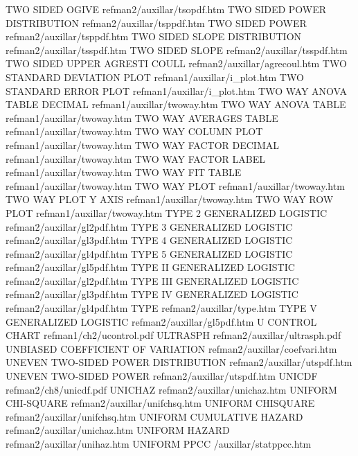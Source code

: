 TWO SIDED OGIVE                         refman2/auxillar/tsopdf.htm
TWO SIDED POWER DISTRIBUTION            refman2/auxillar/tsppdf.htm
TWO SIDED POWER                         refman2/auxillar/tsppdf.htm
TWO SIDED SLOPE DISTRIBUTION            refman2/auxillar/tsspdf.htm
TWO SIDED SLOPE                         refman2/auxillar/tsspdf.htm
TWO SIDED UPPER AGRESTI COULL           refman2/auxillar/agrecoul.htm
TWO STANDARD DEVIATION PLOT             refman1/auxillar/i_plot.htm
TWO STANDARD ERROR PLOT                 refman1/auxillar/i_plot.htm
TWO WAY ANOVA TABLE DECIMAL             refman1/auxillar/twoway.htm
TWO WAY ANOVA TABLE                     refman1/auxillar/twoway.htm
TWO WAY AVERAGES TABLE                  refman1/auxillar/twoway.htm
TWO WAY COLUMN PLOT                     refman1/auxillar/twoway.htm
TWO WAY FACTOR DECIMAL                  refman1/auxillar/twoway.htm
TWO WAY FACTOR LABEL                    refman1/auxillar/twoway.htm
TWO WAY FIT TABLE                       refman1/auxillar/twoway.htm
TWO WAY PLOT                            refman1/auxillar/twoway.htm
TWO WAY PLOT Y AXIS                     refman1/auxillar/twoway.htm
TWO WAY ROW PLOT                        refman1/auxillar/twoway.htm
TYPE 2 GENERALIZED LOGISTIC             refman2/auxillar/gl2pdf.htm
TYPE 3 GENERALIZED LOGISTIC             refman2/auxillar/gl3pdf.htm
TYPE 4 GENERALIZED LOGISTIC             refman2/auxillar/gl4pdf.htm
TYPE 5 GENERALIZED LOGISTIC             refman2/auxillar/gl5pdf.htm
TYPE II GENERALIZED LOGISTIC            refman2/auxillar/gl2pdf.htm
TYPE III GENERALIZED LOGISTIC           refman2/auxillar/gl3pdf.htm
TYPE IV GENERALIZED LOGISTIC            refman2/auxillar/gl4pdf.htm
TYPE                                    refman2/auxillar/type.htm
TYPE V GENERALIZED LOGISTIC             refman2/auxillar/gl5pdf.htm
U CONTROL CHART                         refman1/ch2/ucontrol.pdf
ULTRASPH                                refman2/auxillar/ultrasph.pdf
UNBIASED  COEFFICIENT OF VARIATION      refman2/auxillar/coefvari.htm
UNEVEN TWO-SIDED POWER DISTRIBUTION     refman2/auxillar/utspdf.htm
UNEVEN TWO-SIDED POWER                  refman2/auxillar/utspdf.htm
UNICDF                                  refman2/ch8/unicdf.pdf
UNICHAZ                                 refman2/auxillar/unichaz.htm
UNIFORM CHI-SQUARE                      refman2/auxillar/unifchsq.htm
UNIFORM CHISQUARE                       refman2/auxillar/unifchsq.htm
UNIFORM CUMULATIVE HAZARD               refman2/auxillar/unichaz.htm
UNIFORM HAZARD                          refman2/auxillar/unihaz.htm
UNIFORM PPCC                            /auxillar/statppcc.htm
